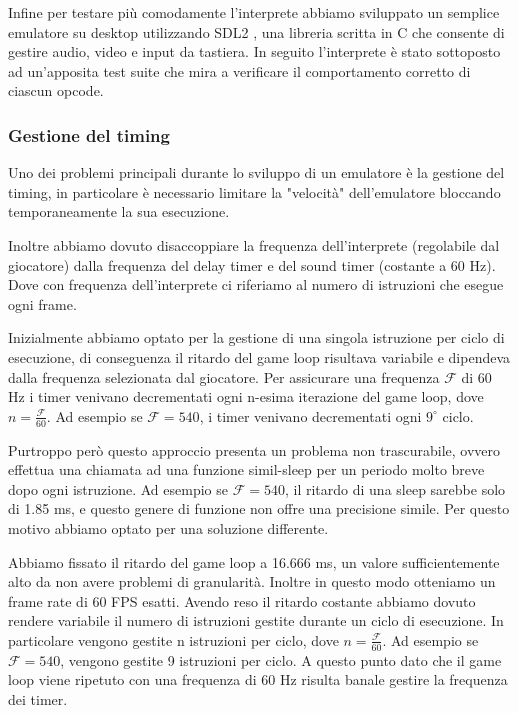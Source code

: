 \documentclass[a4paper]{article}
\begin{document}
Infine per testare più comodamente l'interprete abbiamo sviluppato
un semplice emulatore su desktop utilizzando SDL2
\cite{libsdl:about}, una libreria scritta in C che consente di
gestire audio, video e input da tastiera.
In seguito l'interprete è stato sottoposto ad un'apposita
test suite \cite{github:chip8-test-suite} che mira a verificare
il comportamento corretto di ciascun opcode.

\subsubsection{Gestione del timing}

Uno dei problemi principali durante lo sviluppo di un emulatore è
la gestione del timing, in particolare è necessario limitare la
"velocità" dell'emulatore bloccando temporaneamente la sua
esecuzione.

Inoltre abbiamo dovuto disaccoppiare la frequenza dell'interprete
(regolabile dal giocatore) dalla frequenza del delay timer e del
sound timer (costante a 60 Hz). Dove con frequenza dell'interprete
ci riferiamo al numero di istruzioni che esegue ogni frame.

Inizialmente abbiamo optato per la gestione di una singola istruzione per ciclo di esecuzione,
di conseguenza il ritardo del game loop risultava variabile e dipendeva dalla frequenza selezionata
dal giocatore. Per assicurare una frequenza $\mathcal{F}$ di 60 Hz i timer venivano decrementati
ogni n-esima iterazione del game loop, dove $n = \frac{\mathcal{F}}{60}$. Ad esempio se
$\mathcal{F} = 540$, i timer venivano decrementati ogni $9^{\circ}$ ciclo.

Purtroppo però questo approccio presenta un problema non trascurabile, ovvero effettua una chiamata
ad una funzione simil-sleep per un periodo molto breve dopo ogni istruzione. Ad esempio se
$\mathcal{F} = 540$, il ritardo di una sleep sarebbe solo di 1.85 ms, e questo genere di funzione
non offre una precisione simile. Per questo motivo abbiamo optato per una soluzione differente.

Abbiamo fissato il ritardo del game loop a 16.666 ms, un valore sufficientemente alto da non avere
problemi di granularità. Inoltre in questo modo otteniamo un frame rate di 60 FPS esatti.
Avendo reso il ritardo costante abbiamo dovuto rendere variabile il numero di istruzioni gestite
durante un ciclo di esecuzione. In particolare vengono gestite n istruzioni per ciclo,
dove $n = \frac{\mathcal{F}}{60}$. Ad esempio se $\mathcal{F} = 540$, vengono gestite 9 istruzioni
per ciclo. A questo punto dato che il game loop viene ripetuto con una frequenza di 60 Hz risulta
banale gestire la frequenza dei timer.
\end{document}
